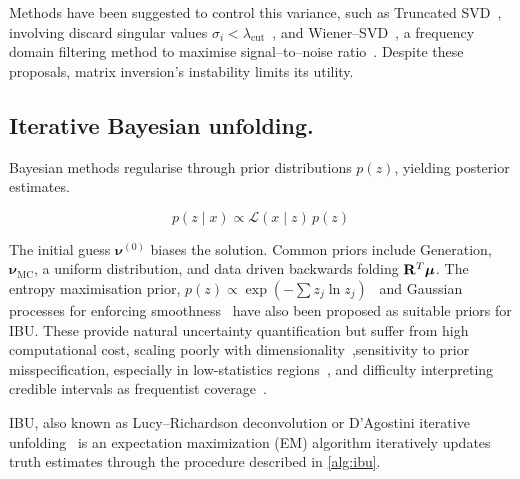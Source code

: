 Methods have been suggested to control this variance, such as Truncated SVD~\cite{deng_fast_2024}, involving discard singular values \(\sigma_i < \lambda_{\text{cut}}\)~\cite{TruncatedSVDDocumentation}, and Wiener--SVD~\cite{tang_data_2017}, a frequency domain filtering method to maximise signal--to--noise ratio~\cite{zaroubi_wiener_1995}.
%
Despite these proposals, matrix inversion's instability limits its utility.

\subsection{Iterative Bayesian unfolding.}

Bayesian methods regularise through prior distributions \(p(z)\), yielding posterior estimates.

\begin{equation}
    p(z\mid x ) \propto \mathcal{L}(x \mid z )\,p(z)
\end{equation}  

The initial guess \(\boldsymbol{\nu}^{(0)}\) biases the solution.
%
Common priors include Generation, \(\boldsymbol{\nu}_{\text{MC}}\), a uniform distribution, and data driven backwards folding \(\mathbf{R}^T \vb*{\mu}\).
%
The entropy maximisation prior, \(p(z) \propto \exp(-\sum z_j \ln z_j)\)~\cite{maeda_new_2013} and Gaussian processes for enforcing smoothness~\cite{bozson_unfolding_2018} have also been proposed as suitable priors for IBU.
%
These provide natural uncertainty quantification but suffer from high computational cost, scaling poorly with dimensionality~\cite{cowan_bayesian_2007},sensitivity to prior misspecification, especially in low-statistics regions~\cite{cowan_bayesian_2006}, and difficulty interpreting credible intervals as frequentist coverage~\cite{james_statistics_2004}.

IBU, also known as Lucy--Richardson deconvolution or D'Agostini iterative unfolding~\cite{dagostini_improved_2010} is an expectation maximization (EM) algorithm iteratively updates truth estimates through the procedure described in \cref{alg:ibu}.

